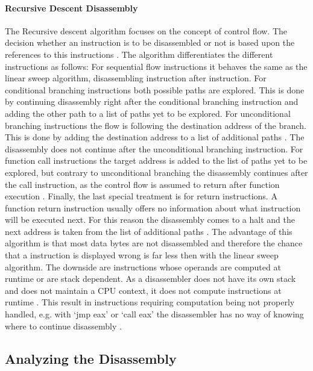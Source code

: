 \documentclass[10pt,twoside,a4paper,bibliography=totoc]{scrbook}
\begin{document}
\paragraph*{Recursive Descent Disassembly}
The Recursive descent algorithm focuses on the concept of control flow. The decision whether an instruction is to be disassembled or not is based upon the references to this instructions \cite{idabook}. 
The algorithm differentiates the different instructions as follows:
For sequential flow instructions it behaves the same as the linear sweep algorithm, disassembling instruction after instruction.
For conditional branching instructions both possible paths are explored. This is done by continuing disassembly right after the conditional branching instruction and adding the other path to a list of paths yet to be explored.
For unconditional branching instructions the flow is following the destination address of the branch. This is done by adding the destination address to a list of additional paths \cite{idabook}. The disassembly does not continue after the unconditional branching instruction.
For function call instructions the target address is added to the list of paths yet to be explored, but contrary to unconditional branching the disassembly continues after the call instruction, as the control flow is assumed to return after function execution \cite{idabook}.
Finally, the last special treatment is for return instructions. A function return instruction usually offers no information about what instruction will be executed next. For this reason the disassembly comes to a halt and the next address is taken from the list of additional paths \cite{idabook}.
The advantage of this algorithm is that most data bytes are not disassembled and therefore the chance that a instruction is displayed wrong is far less then with the linear sweep algorithm.
The downside are instructions whose operands are computed at runtime or are stack dependent. As a disassembler does not have its own stack and does not maintain a CPU context, it does not compute instructions at runtime \cite{eilam}. 
This  result in instructions requiring computation being not properly handled, e.g. with `jmp eax' or `call eax' the disassembler has no way of knowing where to continue disassembly \cite{idabook}.\\

\subsection{Analyzing the Disassembly}
\label{sec2:analysis}
\end{document}
